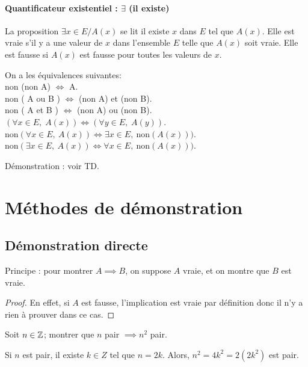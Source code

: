 \paragraph{Quantificateur existentiel : $\exists$ (il existe)}


La proposition \og$\exists x\in E\slash A(x)$\fg{} se lit \og il existe $x$ dans $E$ tel que $A(x)$\fg. Elle est vraie s'il y a une valeur de $x$ dans l'ensemble $E$ telle que $A(x)$ soit vraie. Elle est fausse si $A(x)$ est fausse pour toutes les valeurs de $x$.



\begin{theoreme} On a les équivalences suivantes:\\
non (non A) $\Leftrightarrow$ A.\\
non ( A ou B ) $\Leftrightarrow$ (non A) et (non B).\\
non ( A et B ) $\Leftrightarrow$ (non A) ou (non B).\\
$(\forall x\in E,\; A(x))\Leftrightarrow (\forall y\in E,\; A(y))$.\\
$\text{non}(\forall x\in E,\: A(x)) \Leftrightarrow \exists x\in E,\: \text{non}(A(x)))$.\\
$\text{non}(\exists x\in E,\: A(x)) \Leftrightarrow \forall x\in E,\: \text{non}(A(x)))$.
\end{theoreme}

Démonstration : voir TD.

\section{Méthodes de démonstration}


\subsection{Démonstration directe}

Principe : pour montrer $A\implies B$, on suppose $A$ vraie, et on montre que $B$ est vraie.

\begin{proof}
En effet, si $A$ est fausse, l'implication est vraie par définition donc il n'y a rien à prouver dans ce cas.
\end{proof}

\begin{exemple}
Soit $n \in \mathbb{Z}$; montrer que \og $n$ pair $\implies n^2$ pair\fg.
\begin{red}
Si $n$ est pair, il existe $k \in Z$ tel que $n = 2k$. Alors, $n^2 = 4k^2 = 2(2k^2)$ est pair.
\end{red}
\end{exemple}

